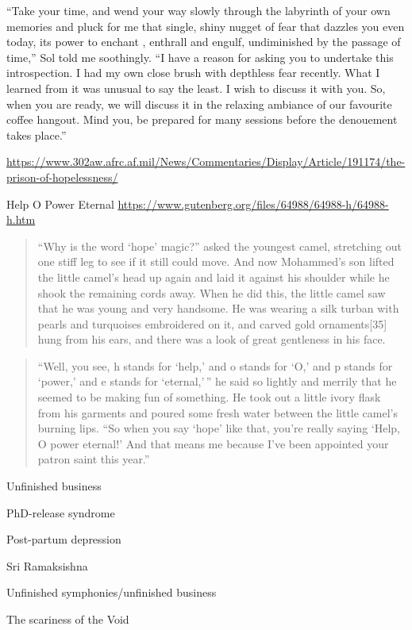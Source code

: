 \documentclass[
  a4paper,
]{article}
\begin{document}
``Take your time, and wend your way slowly through the labyrinth of your
own memories and pluck for me that single, shiny nugget of fear that
dazzles you even today, its power to enchant , enthrall and engulf,
undiminished by the passage of time,'' Sol told me soothingly. ``I have
a reason for asking you to undertake this introspection. I had my own
close brush with depthless fear recently. What I learned from it was
unusual to say the least. I wish to discuss it with you. So, when you
are ready, we will discuss it in the relaxing ambiance of our favourite
coffee hangout. Mind you, be prepared for many sessions before the
denouement takes place.''

\url{https://www.302aw.afrc.af.mil/News/Commentaries/Display/Article/191174/the-prison-of-hopelessness/}

Help O Power Eternal
\url{https://www.gutenberg.org/files/64988/64988-h/64988-h.htm}

\begin{quote}
``Why is the word `hope' magic?'' asked the youngest camel, stretching
out one stiff leg to see if it still could move. And now Mohammed's son
lifted the little camel's head up again and laid it against his shoulder
while he shook the remaining cords away. When he did this, the little
camel saw that he was young and very handsome. He was wearing a silk
turban with pearls and turquoises embroidered on it, and carved gold
ornaments{[}35{]} hung from his ears, and there was a look of great
gentleness in his face.
\end{quote}

\begin{quote}
``Well, you see, h stands for `help,' and o stands for `O,' and p stands
for `power,' and e stands for `eternal,'\,'' he said so lightly and
merrily that he seemed to be making fun of something. He took out a
little ivory flask from his garments and poured some fresh water between
the little camel's burning lips. ``So when you say `hope' like that,
you're really saying `Help, O power eternal!' And that means me because
I've been appointed your patron saint this year.''
\end{quote}

Unfinished business

PhD-release syndrome

Post-partum depression

Sri Ramaksishna

Unfinished symphonies/unfinished business

The scariness of the Void
\end{document}
